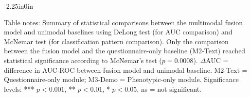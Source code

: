 \documentclass[10pt,letterpaper]{article}
\begin{document}
\begin{table}[!t]
\begin{adjustwidth}{-2.25in}{0in}
                                                                                                                          \begin{flushleft}
                                                                                                                          Table notes: Summary of statistical comparisons between the multimodal fusion model and unimodal baselines using DeLong test (for AUC comparison) and McNemar test (for classification pattern comparison). Only the comparison between the fusion model and the questionnaire-only baseline (M2-Text) reached statistical significance according to McNemar's test ($p = 0.0008$). $\Delta$AUC = difference in AUC-ROC between fusion model and unimodal baseline. M2-Text = Questionnaire-only module; M3-Demo = Phenotypic-only module. Significance levels: *** $p<0.001$, ** $p<0.01$, * $p<0.05$, ns = not significant.
                                                                                                                          \end{flushleft}
                                                                                                                          \end{adjustwidth}
                                                                                                                          \end{table}
\end{document}
